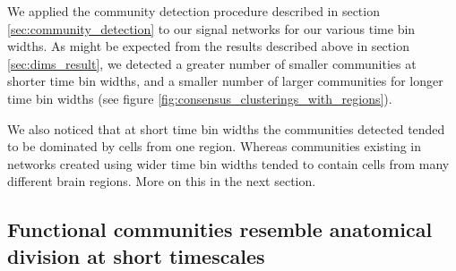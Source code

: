 \documentclass[a4paper,12pt]{article}
\theoremstyle{definition}
\begin{document}
  We applied the community detection procedure described in section \ref{sec:community_detection} to our signal networks for our various time bin widths. As might be expected from the results described above in section \ref{sec:dims_result}, we detected a greater number of smaller communities at shorter time bin widths, and a smaller number of larger communities for longer time bin widths (see figure \ref{fig:consensus_clusterings_with_regions}).

  We also noticed that at short time bin widths the communities detected tended to be dominated by cells from one region. Whereas communities existing in networks created using wider time bin widths tended to contain cells from many different brain regions. More on this in the next section.

  \subsection{Functional communities resemble anatomical division at short timescales}
\end{document}
